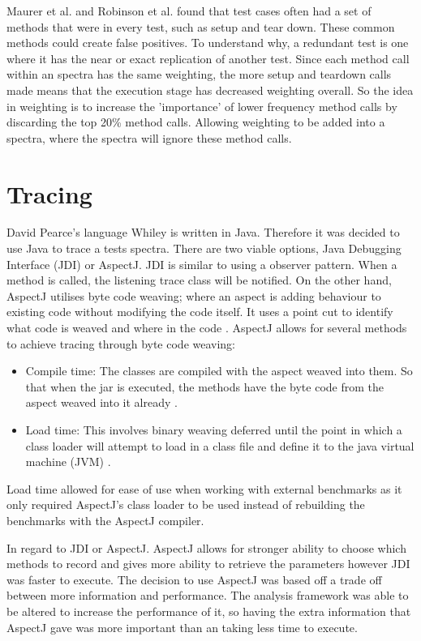 Maurer et al. \cite{koochakzadeh2009test} and Robinson et al. \cite{li2008static} found that test cases often had a set of methods that were in every test, such as setup and tear down. These common methods could create false positives. To understand why, a redundant test is one where it has the near or exact replication of another test. Since each method call within an spectra has the same weighting, the more setup and teardown calls made means that the execution stage has decreased weighting overall. So the idea in weighting is to increase the 'importance' of lower frequency method calls by discarding the top 20\% method calls. Allowing weighting to be added into a spectra, where the spectra will ignore these method calls.

\section{Tracing}
\label{S:trace}

David Pearce's language Whiley is written in Java. Therefore it was decided to use Java to trace a tests spectra. There are two viable options, Java Debugging Interface (JDI) or AspectJ. JDI is similar to using a observer pattern. When a method is called, the listening trace class will be notified. On the other hand, AspectJ utilises byte code weaving; where an aspect is adding behaviour to existing code without modifying the code itself. It uses a point cut to identify what code is weaved and where in the code \cite{aspectwiki}. AspectJ allows for several methods to achieve tracing through byte code weaving:

\begin{itemize}
\item Compile time:
The classes are compiled with the aspect weaved into them. So that when the jar is executed, the methods have the byte code from the aspect weaved into it already \cite{weaving}.
\item Load time:
This involves binary weaving deferred until the point in which a class loader will attempt to load in a class file and define it to the java virtual machine (JVM) \cite{weaving}.
\end{itemize}

Load time allowed for ease of use when working with external benchmarks as it only required AspectJ's class loader to be used instead of rebuilding the benchmarks with the AspectJ compiler.

In regard to JDI or AspectJ. AspectJ allows for stronger ability to choose which methods to record and gives more ability to retrieve the parameters however JDI was faster to execute. The decision to use AspectJ was based off a trade off between more information and performance. The analysis framework was able to be altered to increase the performance of it, so having the extra information that AspectJ gave was more important than an taking less time to execute.

